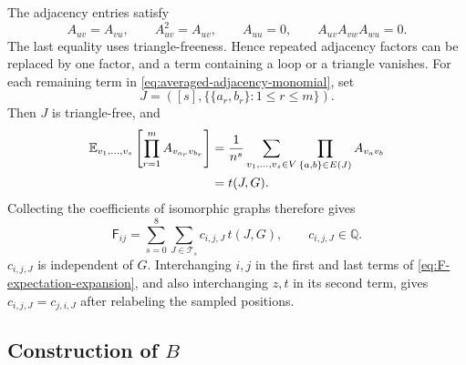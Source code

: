 The adjacency entries satisfy
\[
A_{uv}=A_{vu},\qquad A_{uv}^2=A_{uv},\qquad A_{uu}=0,
\qquad A_{uv}A_{vw}A_{wu}=0.
\]
The last equality uses triangle-freeness.
Hence repeated adjacency factors can be replaced by one factor,
and a term containing a loop or a triangle vanishes.
For each remaining term in \eqref{eq:averaged-adjacency-monomial}, set
\[
J=\left([s],\big\{\{a_r,b_r\}:1\leq r\leq m\big\}\right).
\]
Then $J$ is triangle-free, and
\begin{align*}
\mathbb E_{v_1,\ldots,v_s}
\left[\prod_{r=1}^m A_{v_{a_r}v_{b_r}}\right]
&=\frac1{n^s}\sum_{v_1,\ldots,v_s\in V}
\prod_{\{a,b\}\in E(J)}A_{v_av_b}\\
&=t(J,G).
\end{align*}
Collecting the coefficients of isomorphic graphs therefore gives
\begin{equation}\label{eq:hom-expansion}
\mathsf F_{ij}
=\sum_{s=0}^8\sum_{J\in\mathcal T_s}c_{i,j,J}\,t(J,G),
\qquad c_{i,j,J}\in\mathbb Q.
\end{equation}
$c_{i,j,J}$ is independent of $G$.
Interchanging $i,j$ in the first and last terms of
\eqref{eq:F-expectation-expansion}, and also interchanging $z,t$ in
its second term, gives $c_{i,j,J}=c_{j,i,J}$ after relabeling the sampled
positions.

\subsection{Construction of \texorpdfstring{$B$}{B}}
\label{subsec:matrix-construction}

